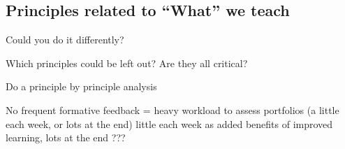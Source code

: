 


\subsection{Principles related to ``What'' we teach} %
\label{sub:principles_related_to_}













Could you do it differently?

Which principles could be left out? Are they all critical?

Do a principle by principle analysis

No frequent formative feedback = heavy workload to assess portfolios (a little each week, or lots at the end) little each week as added benefits of improved learning, lots at the end ???


